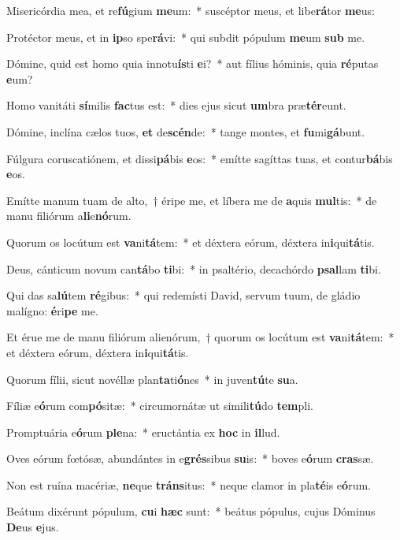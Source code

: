\item Misericórdia mea, et re\textbf{fú}gium \textbf{me}um:~* suscéptor meus, et libe\textbf{rá}tor \textbf{me}us:
\item Protéctor meus, et in \textbf{ip}so spe\textbf{rá}vi:~* qui subdit pópulum \textbf{me}um \textbf{sub} me.
\item Dómine, quid est homo quia innotu\textbf{ís}ti \textbf{e}i?~* aut fílius hóminis, quia \textbf{ré}putas \textbf{e}um?
\item Homo vanitáti \textbf{sí}milis \textbf{fac}tus est:~* dies ejus sicut \textbf{um}bra præ\textbf{tér}eunt.
\item Dómine, inclína cælos tuos, \textbf{et} de\textbf{scén}de:~* tange montes, et \textbf{fu}mi\textbf{gá}bunt.
\item Fúlgura coruscatiónem, et dissi\textbf{pá}bis \textbf{e}os:~* emítte sagíttas tuas, et contur\textbf{bá}bis \textbf{e}os.
\item Emítte manum tuam de alto,~† éripe me, et líbera me de \textbf{a}quis \textbf{mul}tis:~* de manu filiórum a\textbf{li}e\textbf{nó}rum.
\item Quorum os locútum est \textbf{va}ni\textbf{tá}tem:~* et déxtera eórum, déxtera in\textbf{i}qui\textbf{tá}tis.
\item Deus, cánticum novum can\textbf{tá}bo \textbf{ti}bi:~* in psaltério, decachórdo \textbf{psal}lam \textbf{ti}bi.
\item Qui das sa\textbf{lú}tem \textbf{ré}gibus:~* qui redemísti David, servum tuum, de gládio malígno: \textbf{é}ri\textbf{pe} me.
\item Et érue me de manu filiórum alienórum,~† quorum os locútum est \textbf{va}ni\textbf{tá}tem:~* et déxtera eórum, déxtera in\textbf{i}qui\textbf{tá}tis.
\item Quorum fílii, sicut novéllæ plan\textbf{ta}ti\textbf{ó}nes~* in juven\textbf{tú}te \textbf{su}a.
\item Fíliæ e\textbf{ó}rum com\textbf{pó}sitæ:~* circumornátæ ut simili\textbf{tú}do \textbf{tem}pli.
\item Promptuária e\textbf{ó}rum \textbf{ple}na:~* eructántia ex \textbf{hoc} in \textbf{il}lud.
\item Oves eórum fœtósæ, abundántes in e\textbf{grés}sibus \textbf{su}is:~* boves e\textbf{ó}rum \textbf{cras}sæ.
\item Non est ruína macériæ, \textbf{ne}que \textbf{tráns}itus:~* neque clamor in pla\textbf{té}is e\textbf{ó}rum.
\item Beátum dixérunt pópulum, \textbf{cu}i \textbf{hæc} sunt:~* beátus pópulus, cujus Dóminus \textbf{De}us \textbf{e}jus.
